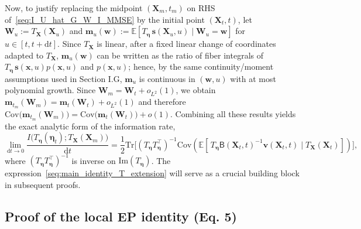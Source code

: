 \documentclass[
 longbibliography,
 twocolumn,
 superscriptaddress,
 amsmath,
 amssymb,
 amsthm,
 amsfonts,
 prl,
 floatfix,
]{revtex4-2}
\newcommand{\matbf}[1]{\boldsymbol{\mathsf{#1}}}
\begin{document}
\begin{widetext}
Now, to justify replacing the midpoint $(\bm X_m,t_m)$ on RHS of~\eqref{seq:I_U_hat_G_W_I_MMSE} by the initial point $(\bm X_t,t)$, let $\bm W_u:=T_{\bm X}(\bm X_u)$ and $\bm m_u(\bm w):=\mathbb E[T_{\bm\eta}\,\bm s(\bm X_u,u)\mid \bm W_u=\bm w]$ for $u\in[t,t+\mathrm dt]$.
Since $T_{\bm X}$ is linear, after a fixed linear change of coordinates adapted to $T_{\bm X}$, $\bm m_u(\bm w)$ can be written as the ratio of fiber integrals of $T_{\bm\eta}\,\bm s(\bm x,u)p(\bm x,u)$ and $p(\bm x,u)$; hence, by the same continuity/moment assumptions used in Section I.G, $\bm m_u$ is continuous in $(\bm w,u)$ with at most polynomial growth. Since $\bm W_m=\bm W_t+o_{L^2}(1)$, we obtain $\bm m_{t_m}(\bm W_m)=\bm m_t(\bm W_t)+o_{L^2}(1)$
and therefore $\mathrm{Cov}\!\big(\bm m_{t_m}(\bm W_m)\big)
=
\mathrm{Cov}\!\big(\bm m_t(\bm W_t)\big)+o(1)$.
Combining all these results yields the exact analytic form of the information rate,
\begin{equation}
    \lim_{\mathrm dt\rightarrow0}\frac{
    I\big(T_{\bm\eta}(\bm\eta_t);T_{\bm X}(\bm X_m)\big)}{\mathrm dt}
    =\frac{1}{2}\mathrm{Tr}\big[(T_{\bm\eta}T_{\bm\eta}^\intercal)^{-1}\mathrm{Cov}
    (\mathbb E[\,T_{\bm\eta}\matbf B(\bm X_t,t)^{-1} \bm v(\bm X_t,t)\mid T_{\bm X}(\bm X_t)])\big],
    \label{seq:main_identity_T_extension}
\end{equation}
where $(T_{\bm\eta}T_{\bm\eta}^\intercal)^{-1}$ is inverse on $\mathrm{Im}(T_{\bm\eta})$. The expression~\eqref{seq:main_identity_T_extension} will serve as a crucial building block in subsequent proofs.


\subsection{Proof of the local EP identity (Eq. 5)}
\vspace*{-0.6\baselineskip}


\end{widetext}
\end{document}
